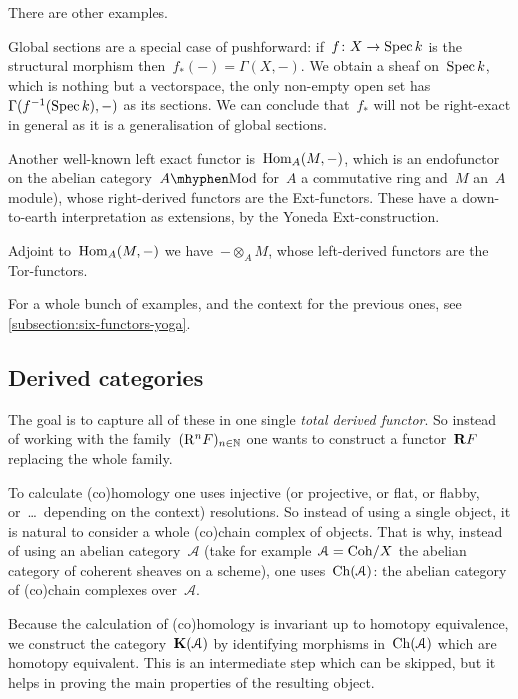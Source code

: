 \documentclass[10pt,a4paper]{article}
\begin{document}
There are other examples.
\begin{example}
  \label{example:global-sections-pushforward}
  Global sections are a special case of pushforward: if~$f\colon X\to\operatorname{Spec} k$ is the structural morphism then~$f_*(-)=\Gamma(X,-)$. We obtain a sheaf on~$\operatorname{Spec} k$, which is nothing but a vectorspace, the only non-empty open set has~$\Gamma(f^{-1}(\operatorname{Spec} k),-)$ as its sections. We can conclude that~$f_*$ will not be right-exact in general as it is a generalisation of global sections.
\end{example}
\begin{example}
  Another well-known left exact functor is~$\operatorname{Hom}_A(M,-)$, which is an endofunctor on the abelian category~$A\mhyphen\mathrm{Mod}$ for~$A$ a commutative ring and~$M$ an~$A$\dash module), whose right-derived functors are the Ext-functors. These have a down-to-earth interpretation as extensions, by the Yoneda Ext-construction.
\end{example}
\begin{example}
  Adjoint to~$\operatorname{Hom}_A(M,-)$ we have~$-\otimes_AM$, whose left-derived functors are the Tor-functors.
\end{example}
For a whole bunch of examples, and the context for the previous ones, see \cref{subsection:six-functors-yoga}.

\subsection{Derived categories}
The goal is to capture all of these in one single \emph{total derived functor}. So instead of working with the family~$(\mathrm{R}^nF)_{n\in\mathbb{N}}$ one wants to construct a functor~$\mathbf{R} F$ replacing the whole family.

To calculate (co)homology one uses injective (or projective, or flat, or flabby, or~\dots\ depending on the context) resolutions. So instead of using a single object, it is natural to consider a whole (co)chain complex of objects. That is why, instead of using an abelian category~$\mathcal{A}$ (take for example~$\mathcal{A}=\mathrm{Coh}/X$ the abelian category of coherent sheaves on a scheme), one uses~$\operatorname{Ch}(\mathcal{A})$: the abelian category of (co)chain complexes over~$\mathcal{A}$.

Because the calculation of (co)homology is invariant up to homotopy equivalence, we construct the category~$\mathbf{K}(\mathcal{A})$ by identifying morphisms in~$\operatorname{Ch}(\mathcal{A})$ which are homotopy equivalent. This is an intermediate step which can be skipped, but it helps in proving the main properties of the resulting object.
\end{document}

